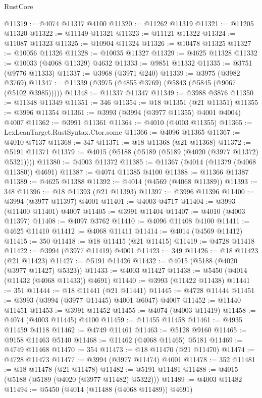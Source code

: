 \begin{lexlean}{RustCore}
\begin{coremodule}
@11319 := @4074 @11317 @4100
@11320 := @11262 @11319
@11321 := @11205 @11320
@11322 := @11149 @11321
@11323 := @11121 @11322
@11324 := @11087 @11323
@11325 := @10904 @11324
@11326 := @10478 @11325
@11327 := @10056 @11326
@11328 := @10035 @11327
@11329 := @4625 @11328
@11332 := @10033 (@4068 @11329) @4632
@11333 := @9851 @11332
@11335 := @3751 (@9776 @11333)
@11337 := @3968 (@3971 @240)
@11339 := @3975 (@3982 @3769)
@11347 := @11339 (@3975 (@4855 @3769) (@5843 (@5845 (@9067 (@5102 @3985)))))
@11348 := @11337 @11347
@11349 := @3988 @3876
@11350 := @11348 @11349
@11351 := 346
@11354 := @18 @11351 (@21 @11351)
@11355 := @3996 @11354
@11361 := @3993 (@3994 (@3977 @11355) @4001 @4004) @4007
@11362 := @3991 @11361
@11364 := @4010 (@4003 @11355)
@11365 := LexLeanTarget.RustSyntax.Ctor.some
@11366 := @4096 @11365
@11367 := @4010 @7137
@11368 := 347
@11371 := @18 @11368 (@21 @11368)
@11372 := @5191 @11371
@11379 := @4015 (@5188 (@5189 (@5189 (@4020 (@3977 @11372) @5321))))
@11380 := @4003 @11372
@11385 := @11367 (@4014 (@11379 (@4068 @11380)) @4691)
@11387 := @4074 @11385 @4100
@11388 := @11366 @11387
@11389 := @4625 @11388
@11392 := @4014 (@4569 (@4068 @11389))
@11393 := 348
@11396 := @18 @11393 (@21 @11393)
@11397 := @3996 @11396
@11400 := @3994 (@3977 @11397) @4001
@11401 := @4003 @4717
@11404 := @3993 (@11400 @11401) @4007
@11405 := @3991 @11404
@11407 := @4010 (@4003 @11397)
@11408 := @4097 @3762
@11410 := @4096 @11408 @4100
@11411 := @4625 @11410
@11412 := @4068 @11411
@11414 := @4014 (@4569 @11412)
@11415 := 350
@11418 := @18 @11415 (@21 @11415)
@11419 := @4728 @11418
@11422 := @3994 (@3977 @11419) @4001
@11423 := 349
@11426 := @18 @11423 (@21 @11423)
@11427 := @5191 @11426
@11432 := @4015 (@5188 (@4020 (@3977 @11427) @5323))
@11433 := @4003 @11427
@11438 := @5450 (@4014 (@11432 (@4068 @11433)) @4691)
@11440 := @3993 (@11422 @11438)
@11441 := 351
@11444 := @18 @11441 (@21 @11441)
@11445 := @4728 @11444
@11451 := @3993 (@3994 (@3977 @11445) @4001 @6047) @4007
@11452 := @11440 @11451
@11453 := @3991 @11452
@11455 := @4074 (@4003 @11419)
@11458 := @4074 (@4003 @11445) @4100
@11459 := @11455 @11458
@11461 := @4935 @11459 @4118
@11462 := @4749 @11461
@11463 := @5128 @9160
@11465 := @9158 @11463 @5140
@11468 := @11462 (@4068 @11465) @5181
@11469 := @4749 @11468
@11470 := 354
@11473 := @18 @11470 (@21 @11470)
@11474 := @4728 @11473
@11477 := @3994 (@3977 @11474) @4001
@11478 := 352
@11481 := @18 @11478 (@21 @11478)
@11482 := @5191 @11481
@11488 := @4015 (@5188 (@5189 (@4020 (@3977 @11482) @5322)))
@11489 := @4003 @11482
@11494 := @5450 (@4014 (@11488 (@4068 @11489)) @4691)

\end{coremodule}
\end{lexlean}
